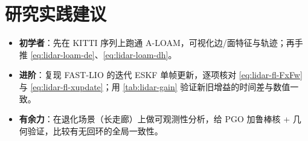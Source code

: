 \section*{研究实践建议}
\begin{itemize}
  \item \textbf{初学者}：先在 KITTI 序列上跑通 A-LOAM，可视化边/面特征与轨迹；再手推 \cref{eq:lidar-loam-de}、\cref{eq:lidar-loam-dh}。
  \item \textbf{进阶}：复现 FAST-LIO 的迭代 ESKF 单帧更新，逐项核对 \cref{eq:lidar-fl-FxFw} 与 \cref{eq:lidar-fl-xupdate}；用 \cref{tab:lidar-gain} 验证新旧增益的时间差与数值一致。
  \item \textbf{有余力}：在退化场景（长走廊）上做可观测性分析，给 PGO 加鲁棒核 + 几何验证，比较有无回环的全局一致性。
\end{itemize}
